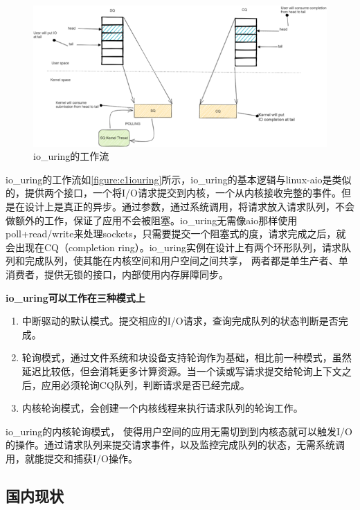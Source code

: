\begin{figure}[htb]
    \figureCapSet
    \centering
    \includegraphics[width=.8\linewidth]{figure/c1/iouring.png}
    \caption{io\_uring的工作流}
    \label{figure:c1iouring}
\end{figure}

io\_uring的工作流如\autoref{figure:c1iouring}所示，io\_uring的基本逻辑与linux-aio是类似的，提供两个接口，一个将I/O请求提交到内核，一个从内核接收完整的事件。但是在设计上是真正的异步。通过参数，通过系统调用，将请求放入请求队列，不会做额外的工作，保证了应用不会被阻塞。io\_uring无需像aio那样使用 poll+read/write来处理sockets，只需要提交一个阻塞式的度，请求完成之后，就会出现在CQ（completion ring）。io\_uring实例在设计上有两个环形队列，请求队列和完成队列，使其能在内核空间和用户空间之间共享， 两者都是单生产者、单消费者，提供无锁的接口，内部使用内存屏障同步。

\textbf{io\_uring可以工作在三种模式上}

\begin{enumerate}
\item 中断驱动的默认模式。提交相应的I/O请求，查询完成队列的状态判断是否完成。
\item 轮询模式，通过文件系统和块设备支持轮询作为基础，相比前一种模式，虽然延迟比较低，但会消耗更多计算资源。当一个读或写请求提交给轮询上下文之后，应用必须轮询CQ队列，判断请求是否已经完成。
\item 内核轮询模式，会创建一个内核线程来执行请求队列的轮询工作。
\end{enumerate}

io\_uring的内核轮询模式， 使得用户空间的应用无需切到到内核态就可以触发I/O的操作。通过请求队列来提交请求事件，以及监控完成队列的状态，无需系统调用，就能提交和捕获I/O操作。


\subsection{国内现状}

